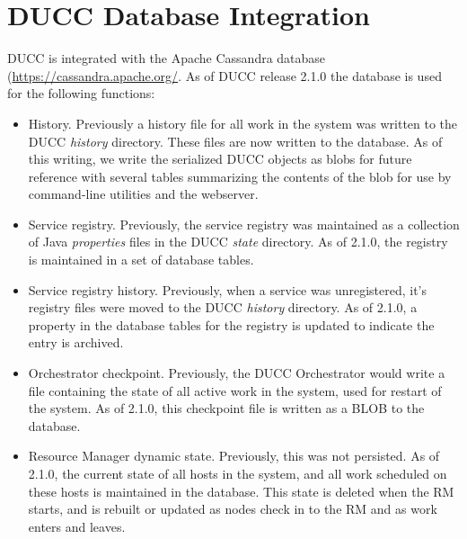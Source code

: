 % 
% 
% 
% 

\section{DUCC Database Integration}

    DUCC is integrated with the Apache Cassandra database (\url{https://cassandra.apache.org/}.  As of
    DUCC release 2.1.0 the database is used for the following functions:
    \begin{itemize}
      \item History.  Previously a history file for all work in the system was written to the
        DUCC {\em history} directory.  These files are now written to the database.  As of this
        writing, we write the serialized DUCC objects as blobs for future reference with
        several tables summarizing the contents of the blob for use by command-line utilities
        and the webserver.
     \item Service registry.  Previously, the service registry was maintained as a collection of
       Java {\em properties} files in the DUCC {\em state} directory.  As of 2.1.0, the registry
       is maintained in a set of database tables.
    \item Service registry history.  Previously, when a service was unregistered, it's registry
      files were moved to the DUCC {\em history} directory.  As of 2.1.0, a property in
      the database tables for the registry is updated to indicate the entry is archived.
    \item Orchestrator checkpoint.  Previously, the DUCC Orchestrator would write a file
      containing the state of all active work in the system, used for restart of the system.  
      As of 2.1.0, this checkpoint file is written as a BLOB to the database.
    \item Resource Manager dynamic state.  Previously, this was not persisted.  As of 2.1.0,
      the current state of all hosts in the system, and all work scheduled on these hosts
      is maintained in the database.  This state is deleted when the RM starts, and is rebuilt
      or updated as nodes check in to the RM and as work enters and leaves.
    \end{itemize}

